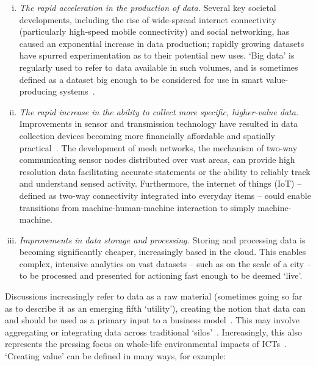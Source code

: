 \documentclass[b5paper,10pt]{article}
\begin{document}
\begin{enumerate}[i)]
\item {\emph{The rapid acceleration in the production of data.}}
Several key societal developments, including the rise of wide-spread
internet connectivity (particularly high-speed mobile connectivity)
and social networking, has caused an exponential increase in data
production; rapidly growing datasets have spurred experimentation as
to their potential new uses. `Big data' is regularly used to refer to
data available in such volumes, and is sometimes defined as a dataset
big enough to be considered for use in smart value-producing
systems~\citep{ojo-et-al:2015,sta:2017,mckinseysmartcities:2018}.
\item {\emph{The rapid increase in the ability to collect more
specific, higher-value data.}} Improvements in sensor and transmission
technology have resulted in data collection devices becoming more
financially affordable and spatially
practical~\citep{townsend:2013}. The development of mesh networks, the
mechanism of two-way communicating sensor nodes distributed over vast
areas, can provide high resolution data facilitating accurate
statements or the ability to reliably track and understand sensed
activity. Furthermore, the internet of things (IoT) -- defined as
two-way connectivity integrated into everyday items -- could enable
transitions from machine-human-machine interaction to simply
machine-machine.
\item {\emph{Improvements in data storage and processing.}} Storing
and processing data is becoming significantly cheaper, increasingly
based in the cloud. This enables complex, intensive analytics on vast
datasets -- such as on the scale of a city -- to be processed and
presented for actioning fast enough to be deemed `live'.
\end{enumerate}

Discussions increasingly refer to data as a raw material (sometimes
going so far as to describe it as an emerging fifth `utility'),
creating the notion that data can and should be used as a primary
input to a business model~\citep{arup-et-al:2011}. This may involve
aggregating or integrating data across traditional
`silos'~\citep{shapiro:2006,tsoukalas:2008}. Increasingly, this also
represents the pressing focus on whole-life environmental impacts of
ICTs~\citep{cooper-et-al-gsict:2015}. `Creating value' can be defined
in many ways, for example:
\end{document}
